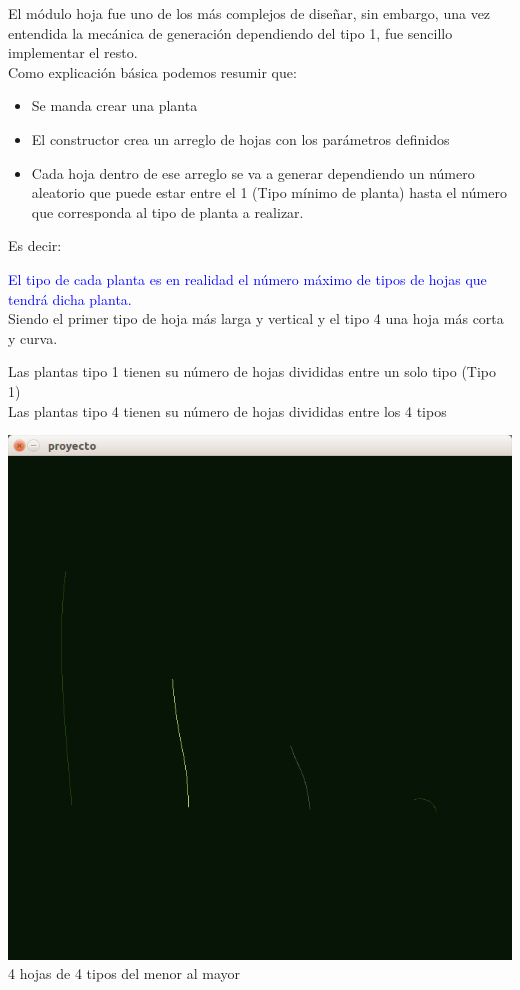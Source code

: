 \documentclass[11pt,a4paper]{article}
\begin{document}
			El módulo hoja fue uno de los más complejos de diseñar, sin embargo, una vez entendida la mecánica de generación dependiendo del tipo 1, fue sencillo implementar el resto.\\
			Como explicación básica podemos resumir que:
			\begin{itemize}
				\item Se manda crear una planta
				\item El constructor crea un arreglo de hojas con los parámetros definidos
				\item Cada hoja dentro de ese arreglo se va a generar dependiendo un número aleatorio que puede estar entre el 1 (Tipo mínimo de planta) hasta el número que corresponda al tipo de planta a realizar.
			\end{itemize}
			Es decir: 
			\begin{center}
			\textcolor{blue}{El tipo de cada planta es en realidad el número máximo de tipos de hojas que tendrá dicha planta.}\\
			{\tiny Siendo el primer tipo de hoja más larga y vertical y el tipo 4 una hoja más corta y curva.}
			\end{center}
			Las plantas tipo 1 tienen su número de hojas divididas entre un solo tipo (Tipo 1)\\
			Las plantas tipo 4 tienen su número de hojas divididas entre los 4 tipos\\
			\begin{center}
			\includegraphics[scale=.4]{CAp8}\\
			{\tiny 4 hojas de 4 tipos del menor al mayor}
			\end{center}
\end{document}
